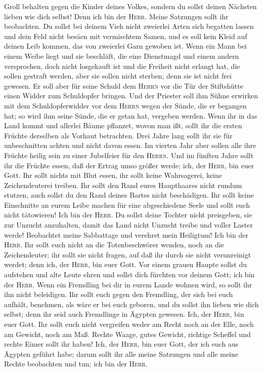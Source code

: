 Groll behalten gegen die Kinder deines Volkes, sondern du sollst deinen
Nächsten lieben wie dich selbst! Denn ich bin der \textsc{Herr}.
 Meine Satzungen sollt ihr beobachten. Du sollst bei
deinem Vieh nicht zweierlei Arten sich begatten lassen und dein Feld
nicht besäen mit vermischtem Samen, und es soll kein Kleid auf deinen
Leib kommen, das von zweierlei Garn gewoben ist.  Wenn
ein Mann bei einem Weibe liegt und sie beschläft, die eine Dienstmagd
und einem andern versprochen, doch nicht losgekauft ist und die Freiheit
nicht erlangt hat, die sollen gestraft werden, aber sie sollen nicht
sterben; denn sie ist nicht frei gewesen.  Er soll aber
für seine Schuld dem \textsc{Herrn} vor die Tür der Stiftshütte einen
Widder zum Schuldopfer bringen.  Und der Priester soll
ihm Sühne erwirken mit dem Schuldopferwidder vor dem \textsc{Herrn}
wegen der Sünde, die er begangen hat; so wird ihm seine Sünde, die er
getan hat, vergeben werden.  Wenn ihr in das Land kommt
und allerlei Bäume pflanzet, wovon man ißt, sollt ihr die ersten Früchte
derselben als Vorhaut betrachten. Drei Jahre lang sollt ihr sie für
unbeschnitten achten und nicht davon essen.  Im vierten
Jahr aber sollen alle ihre Früchte heilig sein zu einer Jubelfeier für
den \textsc{Herrn}.  Und im fünften Jahre sollt ihr die
Früchte essen, daß der Ertrag umso größer werde; ich, der \textsc{Herr},
bin euer Gott.  Ihr sollt nichts mit Blut essen, ihr
sollt keine Wahrsagerei, keine Zeichendeuterei treiben. 
Ihr sollt den Rand eures Haupthaares nicht rundum stutzen, auch sollst
du den Rand deines Bartes nicht beschädigen.  Ihr sollt
keine Einschnitte an eurem Leibe machen für eine abgeschiedene Seele und
sollt euch nicht tätowieren! Ich bin der \textsc{Herr}. 
Du sollst deine Tochter nicht preisgeben, sie zur Unzucht anzuhalten,
damit das Land nicht Unzucht treibe und voller Laster werde!
 Beobachtet meine Sabbattage und verehret mein Heiligtum!
Ich bin der \textsc{Herr}.  Ihr sollt euch nicht an die
Totenbeschwörer wenden, noch an die Zeichendeuter; ihr sollt sie nicht
fragen, auf daß ihr durch sie nicht verunreinigt werdet; denn ich, der
\textsc{Herr}, bin euer Gott.  Vor einem grauen Haupte
sollst du aufstehen und alte Leute ehren und sollst dich fürchten vor
deinem Gott; ich bin der \textsc{Herr}.  Wenn ein
Fremdling bei dir in eurem Lande wohnen wird, so sollt ihr ihn nicht
beleidigen.  Ihr sollt euch gegen den Fremdling, der sich
bei euch aufhält, benehmen, als wäre er bei euch geboren, und du sollst
ihn lieben wie dich selbst; denn ihr seid auch Fremdlinge in Ägypten
gewesen. Ich, der \textsc{Herr}, bin euer Gott.  Ihr
sollt euch nicht vergreifen weder am Recht noch an der Elle, noch am
Gewicht, noch am Maß.  Rechte Waage, gutes Gewicht,
richtige Scheffel und rechte Eimer sollt ihr haben! Ich, der
\textsc{Herr}, bin euer Gott, der ich euch aus Ägypten geführt habe;
 darum sollt ihr alle meine Satzungen und alle meine
Rechte beobachten und tun; ich bin der \textsc{Herr}.

